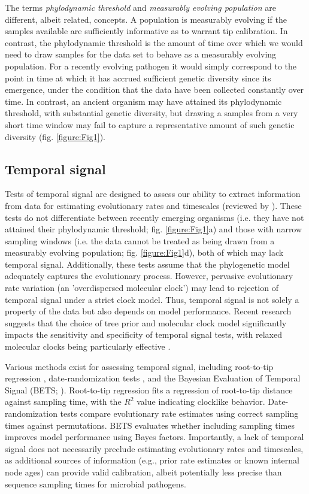 \documentclass[11pt]{article}
\begin{document}
The terms \textit{phylodynamic threshold} and \textit{measurably evolving population} are different, albeit related, concepts. A population is measurably evolving if the samples available are sufficiently informative as to warrant tip calibration. In contrast, the phylodynamic threshold is the amount of time over which we would need to draw samples for the data set to behave as a measurably evolving population. For a recently evolving pathogen it would simply correspond to the point in time at which it has accrued sufficient genetic diversity since its emergence, under the condition that the data have been collected constantly over time. In contrast, an ancient organism may have attained its phylodynamic threshold, with substantial genetic diversity, but drawing a samples from a very short time window may fail to capture a representative amount of such genetic diversity (fig. \ref{figure:Fig1}).

\subsection{Temporal signal}
Tests of temporal signal are designed to assess our ability to extract information from data for estimating evolutionary rates and timescales (reviewed by \cite{rieux2016inferences}). These tests do not differentiate between recently emerging organisms (i.e. they have not attained their phylodynamic threshold; fig. \ref{figure:Fig1}a) and those with narrow sampling windows (i.e. the data cannot be treated as being drawn from a measurably evolving population; fig. \ref{figure:Fig1}d), both of which may lack temporal signal. Additionally, these tests assume that the phylogenetic model adequately captures the evolutionary process. However, pervasive evolutionary rate variation (an 'overdispersed molecular clock') may lead to rejection of temporal signal under a strict clock model. Thus, temporal signal is not solely a property of the data but also depends on model performance. Recent research suggests that the choice of tree prior and molecular clock model significantly impacts the sensitivity and specificity of temporal signal tests, with relaxed molecular clocks being particularly effective \citep{tay2024assessing}.

Various methods exist for assessing temporal signal, including root-to-tip regression \citep{buonagurio1986evolution, gojobori1990molecular, drummond2003inference}, date-randomization tests \citep{ramsden2009hantavirus, duchene2015performance, duchene2018inferring, trovao2015host}, and the Bayesian Evaluation of Temporal Signal (BETS; \cite{duchene2020bayesian}). Root-to-tip regression fits a regression of root-to-tip distance against sampling time, with the $R^2$ value indicating clocklike behavior. Date-randomization tests compare evolutionary rate estimates using correct sampling times against permutations. BETS evaluates whether including sampling times improves model performance using Bayes factors. Importantly, a lack of temporal signal does not necessarily preclude estimating evolutionary rates and timescales, as additional sources of information (e.g., prior rate estimates or known internal node ages) can provide valid calibration, albeit potentially less precise than sequence sampling times for microbial pathogens.
\end{document}
